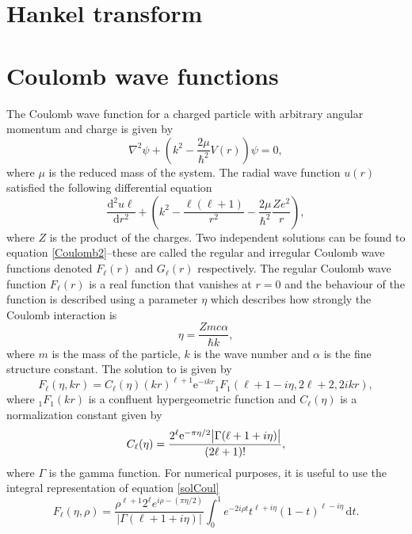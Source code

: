 \section{Hankel transform}
\section{Coulomb wave functions}
The Coulomb wave function for a charged particle with arbitrary angular momentum and charge is given by 
\begin{equation} \label{Coulomb1}
	\nabla^2\psi +\left( k^2-\frac{2\mu}{\hbar^2}V(r)\right)\psi = 0,
\end{equation}
where $\mu$ is the reduced mass of the system. The radial wave function $u(r)$ satisfied the following differential equation
\begin{equation} \label{Coulomb2}
	\frac{\text{d}^2 u\ell}{\text{d}r^2}+\left( k^2-\frac{\ell(\ell+1)}{r^2}-\frac{2\mu}{\hbar^2}\frac{Ze^2}{r}\right),
\end{equation}
where $Z$ is the product of the charges. Two independent solutions can be found to equation \eqref{Coulomb2}--these are called the regular and irregular Coulomb wave functions denoted $F_\ell(r)$ and $G_\ell(r)$ respectively. The regular Coulomb wave function $F_\ell(r)$ is a real function that vanishes at $r=0$ and the behaviour of the function is described using a parameter $\eta$ which describes how strongly the Coulomb interaction is
\begin{equation} \label{etafactor}
	\eta = \frac{Zmc\alpha }{\hbar k},
\end{equation}
where $m$ is the mass of the particle, $k$ is the wave number and $\alpha$ is the fine structure constant. The solution to is given by
\begin{equation} \label{solCoul}
	F_\ell(\eta,kr) = C_\ell (\eta) (kr)^{\ell+1}\text{e}^{-ikr}  {}_1 F_1(\ell+1-i\eta,2\ell+2,2ikr),
\end{equation}
where ${}_1F_1(kr)$ is a confluent hypergeometric function and $C_\ell(\eta)$ is a normalization constant given by 
\begin{equation} \label{normalization}
	C_\ell(\eta) = \frac{2^\ell \text{e}^{-\pi\eta/2}\abs{\Gamma(\ell+1+i\eta)}}{(2\ell+1)!},
\end{equation}
where $\Gamma$ is the gamma function. For numerical purposes, it is useful to use the integral representation of equation \eqref{solCoul} \cite[eq. 33.7.1]{NIST} 
\begin{equation} \label{integralrep}
	F_\ell(\eta,\rho) = \frac{\rho^{\ell+1}2^\ell e^{i\rho-(\pi\eta/2)}}{|\Gamma(\ell+1+i\eta)|} \int_0^1 e^{-2i\rho t}t^{\ell+i\eta}(1-t)^{\ell-i\eta} \, \text{d}t.
\end{equation}
